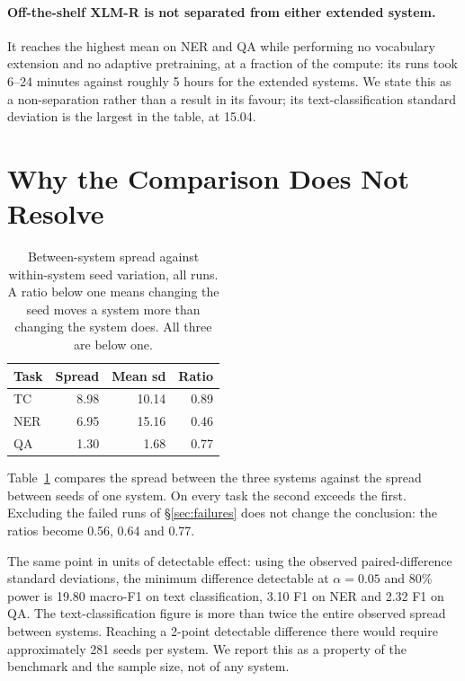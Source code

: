 \documentclass[11pt]{article}
\begin{document}
\paragraph{Off-the-shelf XLM-R is not separated from either extended
system.} It reaches the highest mean on NER and QA while performing no
vocabulary extension and no adaptive pretraining, at a fraction of the
compute: its runs took 6--24 minutes against roughly 5 hours for the
extended systems. We state this as a non-separation rather than a result in
its favour; its text-classification standard deviation is the largest in the
table, at 15.04.

\section{Why the Comparison Does Not Resolve}
\label{sec:resolution}

\begin{table}[t]
\centering
\small
\begin{tabular}{lrrr}
\toprule
Task & Spread & Mean sd & Ratio \\
\midrule
TC  & 8.98 & 10.14 & 0.89 \\
NER & 6.95 & 15.16 & 0.46 \\
QA  & 1.30 & 1.68  & 0.77 \\
\bottomrule
\end{tabular}
\caption{Between-system spread against within-system seed variation, all
runs. A ratio below one means changing the seed moves a system more than
changing the system does. All three are below one.}
\label{tab:snr}
\end{table}

Table~\ref{tab:snr} compares the spread between the three systems against
the spread between seeds of one system. On every task the second exceeds the
first. Excluding the failed runs of \S\ref{sec:failures} does not change the
conclusion: the ratios become 0.56, 0.64 and 0.77.

The same point in units of detectable effect: using the observed
paired-difference standard deviations, the minimum difference detectable at
$\alpha = 0.05$ and 80\% power is 19.80 macro-F1 on text classification, 3.10
F1 on NER and 2.32 F1 on QA. The text-classification figure is more than
twice the entire observed spread between systems. Reaching a 2-point
detectable difference there would require approximately 281 seeds per
system. We report this as a property of the benchmark and the sample size,
not of any system.
\end{document}
